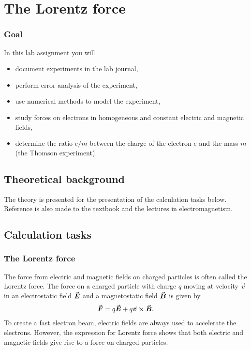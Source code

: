 \documentclass[../Elmag-labhefte-2020.tex]{subfiles}
\begin{document}
\chapter{The Lorentz force\label{ch.lorentz}}

\subsection*{Goal}

In this lab assignment you will
%
\begin{itemize}
    \item document experiments in the lab journal,
    \item perform error analysis of the experiment,
    \item use numerical methods to model the experiment,
    \item study forces on electrons in homogeneous and constant electric and magnetic fields,
    \item determine the ratio $e/m$ between the charge of the electron $e$ and the mass $m$ (the Thomson experiment).
\end{itemize}
%

\section{Theoretical background}

The theory is presented for the presentation of the calculation tasks below. Reference is also made to the textbook and the lectures in electromagnetism.

\section{Calculation tasks \label{ch.lorentz.beregn}}

\subsection{The Lorentz force}

The force from electric and magnetic fields on charged particles is often called the Lorentz force. The force on a charged particle with charge $q$ moving at velocity $\vec{v}$ in an electrostatic field $\va*{E}$ and a magnetostatic field $\va*{B}$ is given by
\begin{equation}
    \va*{F} = q \va*{E} + q \va*{v} \cross \va*{B} .
    \label{eq:lorentz.lorentz} %
\end{equation}
%
To create a fast electron beam, electric fields are always used to accelerate the electrons. However, the expression for Lorentz force shows that both electric and magnetic fields give rise to a force on charged particles.
\end{document}
